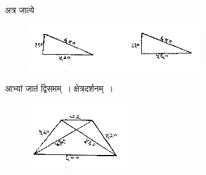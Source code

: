 \documentclass[11pt, openany]{book}
\begin{document}
अत्र जात्ये\textendash
\vspace{-2mm}

\begin{figure}[h!]
         \centering
         \includegraphics[scale=0.85]{graphics/capture153.png}
     \end{figure}
\vspace{-4mm}

आभ्यां जातं द्विसमम्~। क्षेत्रदर्शनम्~। 
\vspace{-2mm}

\begin{figure}[h!]
         \centering
         \includegraphics[scale=0.85]{graphics/capture154.png}
     \end{figure}
\vspace{-2mm}
\end{document}
